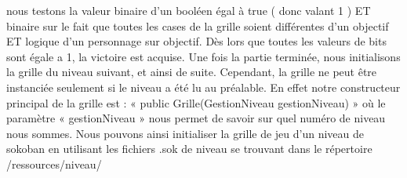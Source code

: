 \documentclass[a4paper,12pt]{article} %
\begin{document}
nous testons la valeur binaire d’un booléen égal à true ( donc valant 1 ) ET binaire sur le fait que toutes les cases de la grille soient différentes d’un objectif ET logique d’un personnage sur objectif.
\newline
Dès lors que toutes les valeurs de bits sont égale a 1, la victoire est acquise.
\newline
Une fois la partie terminée, nous initialisons la grille du niveau suivant, et ainsi de suite.
\newline
Cependant, la grille ne peut être instanciée seulement si le niveau a été lu au préalable. En effet notre constructeur principal de la grille est : « public Grille(GestionNiveau gestionNiveau) » où le paramètre « gestionNiveau » nous permet de savoir sur quel numéro de niveau nous sommes.
Nous pouvons ainsi initialiser la grille de jeu d’un niveau de sokoban en utilisant les fichiers .sok de niveau se trouvant dans le répertoire /ressources/niveau/
\end{document}
